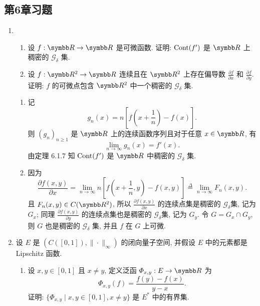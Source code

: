 \subsection{第6章习题}
\begin{enumerate}
  \item 
    \begin{enumerate}
      \item 设 $f:\R\to\R$ 是可微函数. 证明: $\mathrm{Cont}(f')$ 是 $\R$ 上稠密的 $\mathcal{G}_{\delta}$ 集.

      \item 设 $f:\R^2\to\R$ 连续且在 $\R^2$ 上存在偏导数 $\frac{\partial f}{\partial x}$ 和 $\frac{\partial f}{\partial y}$.
      证明: $f$ 的可微点包含 $\R^2$ 中一个稠密的 $\mathcal{G}_{\delta}$ 集.
    \end{enumerate}
    \begin{answer}
      \begin{enumerate}
        \item 记
        \[g_n(x)=n\left[f\left(x+\frac{1}{n}\right)-f(x)\right].\]
        则 $(g_n)_{n\geq 1}$ 是 $\R$ 上的连续函数序列且对于任意 $x\in\R$, 有
        \[\lim_{n\to\infty}g_n(x)=f'(x).\]
        由定理 6.1.7 知 $\mathrm{Cont}(f')$ 是 $\R$ 中稠密的 $\mathcal{G}_{\delta}$ 集.
    
        \item 因为 
        \[\frac{\partial f(x,y)}{\partial x}=\lim\limits_{n\to\infty}n\left[f\left(x+\frac{1}{n},y\right)-f(x,y)\right]\overset{\Delta}{=}\lim\limits_{n\to\infty}F_n(x,y).\]
        且 $F_n(x,y)\in C(\R^2)$, 所以 $\frac{\partial f(x,y)}{\partial x}$ 
        的连续点集是稠密的 $\mathcal{G}_{\delta}$集, 记为 $G_x$;
        同理 $\frac{\partial f(x,y)}{\partial y}$ 的连续点集也是稠密的 $\mathcal{G}_{\delta}$集,
        记为 $G_y$. 令 $G=G_x\cap G_y$, 则 $G$ 也是稠密的 $\mathcal{G}_{\delta}$ 集, 并且 $f$ 在 $G$ 上可微.
      \end{enumerate}
    \end{answer}
  \item     设 $E$ 是 $(C([0,1]),\|\cdot\|_{\infty})$ 的闭向量子空间, 并假设 $E$ 中的元素都是 Lipschitz 函数.

    \begin{enumerate}
      \item 设 $x,y\in [0,1]$ 且 $x\neq y$, 定义泛函 $\varPhi_{x,y}:E\to\R$ 为
      \[\varPhi_{x,y}(f)=\frac{f(y)-f(x)}{y-x}.\]
      证明: $\{\varPhi_{x,y}\mid x,y\in [0,1],x\neq y\}$ 是 $E^*$ 中的有界集.
    

\end{enumerate}
\end{enumerate}
